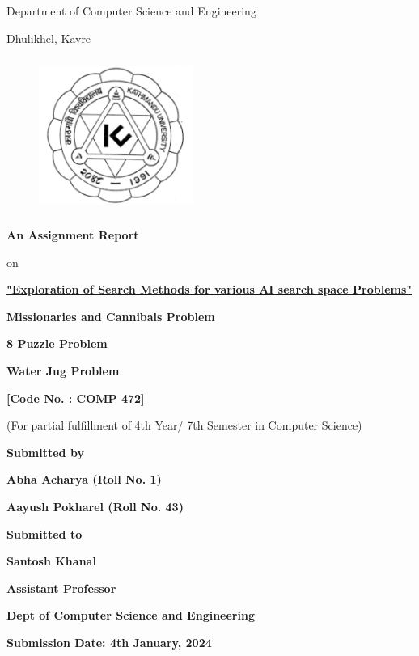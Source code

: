 \documentclass[12pt]{article}
\begin{document}
\thispagestyle{empty}

\section*{}
{\LARGE{}}

\centerline{Department of Computer Science and Engineering}
\centerline{Dhulikhel, Kavre}
\begin{figure}[h]
    \centerline{\includegraphics[width=50.546mm,height=50.546mm]{KU_Logo.png}}
\end{figure}

\centerline{\textbf{An Assignment Report}}
\centerline{on}
\centerline{\underline{\textbf{"Exploration of Search Methods for various AI search space Problems"}}}
\vspace*{5mm}
\centerline{\textbf{Missionaries and Cannibals Problem}}
\centerline{\textbf{8 Puzzle Problem}}
\centerline{\textbf{Water Jug Problem}}

\vspace*{8mm}

\centerline{\textbf{[Code No. : COMP 472]}}
\centerline{(For partial fulfillment of 4th Year/ 7th Semester in Computer Science)}

\vspace*{15mm}

\centerline{\textbf{Submitted by}}
\centerline{\textbf{Abha Acharya (Roll No. 1)}}
\centerline{\textbf{Aayush Pokharel (Roll No. 43)}}

\vspace*{16mm}

\centerline{\underline{\textbf{Submitted to}}}
\centerline{\textbf{Santosh Khanal}}
\centerline{\textbf{Assistant Professor}}
\centerline{\textbf{Dept of Computer Science and Engineering}}
\vspace*{30mm}

\centerline{\textbf{Submission Date: 4th January, 2024}}

\clearpage
\end{document}
